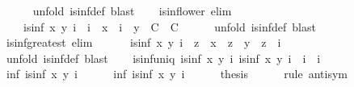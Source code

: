 \begin{isabellebody}
\ \ \ \ \isamarkupfalse%
\ {\isacharparenleft}unfold\ is{\isacharunderscore}inf{\isacharunderscore}def{\isacharparenright}\ blast\isanewline
\isanewline
\ \ \isamarkupfalse%
\ is{\isacharunderscore}inf{\isacharunderscore}lower\ {\isacharbrackleft}elim{\isacharquery}{\isacharbrackright}{\isacharcolon}\isanewline
\ \ \ \ {\isachardoublequoteopen}is{\isacharunderscore}inf\ x\ y\ i\ {\isasymLongrightarrow}\ {\isacharparenleft}i\ {\isasymsqsubseteq}\ x\ {\isasymLongrightarrow}\ i\ {\isasymsqsubseteq}\ y\ {\isasymLongrightarrow}\ C{\isacharparenright}\ {\isasymLongrightarrow}\ C{\isachardoublequoteclose}\isanewline
\ \ \ \ \isamarkupfalse%
\ {\isacharparenleft}unfold\ is{\isacharunderscore}inf{\isacharunderscore}def{\isacharparenright}\ blast\isanewline
\isanewline
\ \ \isamarkupfalse%
\ is{\isacharunderscore}inf{\isacharunderscore}greatest\ {\isacharbrackleft}elim{\isacharquery}{\isacharbrackright}{\isacharcolon}\isanewline
\ \ \ \ \ \ {\isachardoublequoteopen}is{\isacharunderscore}inf\ x\ y\ i\ {\isasymLongrightarrow}\ z\ {\isasymsqsubseteq}\ x\ {\isasymLongrightarrow}\ z\ {\isasymsqsubseteq}\ y\ {\isasymLongrightarrow}\ z\ {\isasymsqsubseteq}\ i{\isachardoublequoteclose}\isanewline
\ \ \ \ \isamarkupfalse%
\ {\isacharparenleft}unfold\ is{\isacharunderscore}inf{\isacharunderscore}def{\isacharparenright}\ blast%
\endisataginvisible
{\isafoldinvisible}%
%
\isadeliminvisible
\isanewline
%
\endisadeliminvisible
\isanewline
\ \ \isamarkupfalse%
\ is{\isacharunderscore}inf{\isacharunderscore}uniq{\isacharcolon}\ {\isachardoublequoteopen}{\isasymlbrakk}is{\isacharunderscore}inf\ x\ y\ i{\isacharsemicolon}\ is{\isacharunderscore}inf\ x\ y\ i{\isacharprime}{\isasymrbrakk}\ {\isasymLongrightarrow}\ i\ {\isacharequal}\ i{\isacharprime}{\isachardoublequoteclose}\isanewline
%
\isadelimproof
\ \ \ \ %
\endisadelimproof
%
\isatagproof
{}\isamarkupfalse%
\ {\isacharminus}\isanewline
\ \ \ \ \isamarkupfalse%
\ inf{\isacharcolon}\ {\isachardoublequoteopen}is{\isacharunderscore}inf\ x\ y\ i{\isachardoublequoteclose}\isanewline
\ \ \ \ \isamarkupfalse%
\ inf{\isacharprime}{\isacharcolon}\ {\isachardoublequoteopen}is{\isacharunderscore}inf\ x\ y\ i{\isacharprime}{\isachardoublequoteclose}\isanewline
\ \ \ \ \isamarkupfalse%
\ {\isacharquery}thesis\isanewline
\ \ \ \ \isamarkupfalse%
\ {\isacharparenleft}rule\ anti{\isacharunderscore}sym{\isacharparenright}\isanewline
\ \ \ \ \ \ \isamarkupfalse%

\end{isabellebody}
